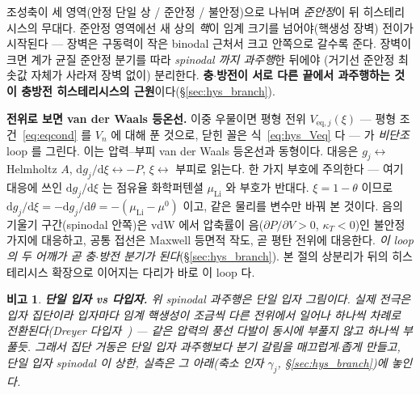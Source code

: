 \documentclass[11pt,a4paper]{article}
\newtheorem*{flagbox}{비고}
\newcommand{\dd}{\mathrm{d}}
\newcommand{\eq}{\mathrm{eq}}
\begin{document}
조성축이 세 영역(안정 단일 상 / 준안정 / 불안정)으로 나뉘며 \emph{준안정}이 뒤 히스테리시스의 무대다. 준안정
영역에선 새 상의 \emph{핵}이 임계 크기를 넘어야(핵생성 장벽) 전이가 시작된다 — 장벽은 구동력이 작은 binodal
근처서 크고 안쪽으로 갈수록 준다. 장벽이 크면 계가 균질 준안정 분기를 따라 \emph{spinodal 까지 과주행}한 뒤에야
(거기선 준안정 최솟값 자체가 사라져 장벽 없이) 분리한다. \textbf{충$\cdot$방전이 서로 다른 끝에서 과주행하는 것이
충방전 히스테리시스의 근원}이다(\S\ref{sec:hys_branch}).

\textbf{전위로 보면 van der Waals 등온선.} 이중 우물이면 평형 전위 $V_{\eq,j}(\xi)$ — 평형 조건~\eqref{eq:eqcond}
를 $V_n$ 에 대해 푼 것으로, 닫힌 꼴은 식~\eqref{eq:hys_Veq} 다 — 가 \emph{비단조} loop 를 그린다. 이는 압력--부피
van der Waals 등온선과 동형이다. 대응은 $g_j\leftrightarrow$ Helmholtz $A$, $\dd g_j/\dd\xi\leftrightarrow-P$,
$\xi\leftrightarrow$ 부피로 읽는다. 한 가지 부호에 주의한다 — 여기 대응에 쓰인 $\dd g_j/\dd\xi$ 는 점유율
화학퍼텐셜 $\mu_\mathrm{Li}$ 와 부호가 반대다. $\xi=1-\theta$ 이므로
$\dd g_j/\dd\xi=-\dd g_j/\dd\theta=-(\mu_\mathrm{Li}-\mu^0)$ 이고, 같은 물리를 변수만 바꿔 본 것이다.
음의 기울기 구간(spinodal 안쪽)은 vdW 에서 압축률이 음($\partial P/\partial V>0$, $\kappa_T<0$)인 불안정 가지에
대응하고, 공통 접선은 Maxwell 등면적 작도, 곧 평탄 전위에 대응한다. \emph{이 loop 의 두 어깨가 곧 충$\cdot$방전
분기가 된다}(\S\ref{sec:hys_branch}). 본 절의 상분리가 뒤의 히스테리시스 확장으로 이어지는 다리가 바로 이 loop 다.
\begin{flagbox}
\textbf{단일 입자 vs 다입자.} 위 spinodal 과주행은 \emph{단일 입자} 그림이다. 실제 전극은 입자 집단이라 입자마다
임계 핵생성이 조금씩 다른 전위에서 일어나 \emph{하나씩 차례로} 전환된다(Dreyer 다입자~\cite{dreyer2010}) —
같은 압력의 풍선 다발이 동시에 부풀지 않고 하나씩 부풀듯. 그래서 집단 거동은 단일 입자 과주행보다 분기 갈림을
\emph{매끄럽게$\cdot$좁게} 만들고, 단일 입자 spinodal 이 \emph{상한}, 실측은 그 아래(축소 인자 $\gamma_j$,
\S\ref{sec:hys_branch})에 놓인다.
\end{flagbox}
\end{document}

